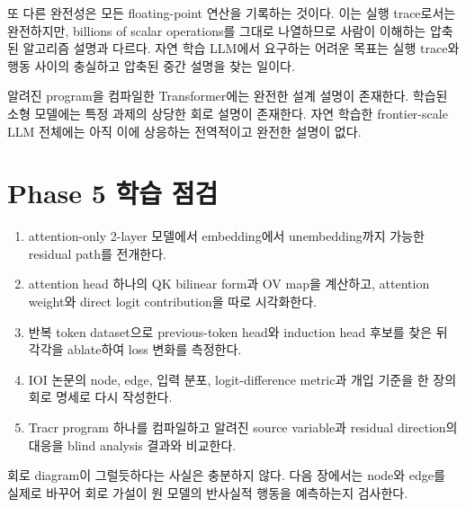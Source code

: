 또 다른 완전성은 모든 floating-point 연산을 기록하는 것이다.
이는 실행 trace로서는 완전하지만, billions of scalar operations를 그대로 나열하므로 사람이 이해하는 압축된 알고리즘 설명과 다르다.
자연 학습 LLM에서 요구하는 어려운 목표는 실행 trace와 행동 사이의 충실하고 압축된 중간 설명을 찾는 일이다.

\begin{factbox}
알려진 program을 컴파일한 Transformer에는 완전한 설계 설명이 존재한다.
학습된 소형 모델에는 특정 과제의 상당한 회로 설명이 존재한다.
자연 학습한 frontier-scale LLM 전체에는 아직 이에 상응하는 전역적이고 완전한 설명이 없다.
\end{factbox}

\section{Phase 5 학습 점검}

\begin{studybox}
\begin{enumerate}
  \item attention-only 2-layer 모델에서 embedding에서 unembedding까지 가능한 residual path를 전개한다.
  \item attention head 하나의 QK bilinear form과 OV map을 계산하고, attention weight와 direct logit contribution을 따로 시각화한다.
  \item 반복 token dataset으로 previous-token head와 induction head 후보를 찾은 뒤 각각을 ablate하여 loss 변화를 측정한다.
  \item IOI 논문의 node, edge, 입력 분포, logit-difference metric과 개입 기준을 한 장의 회로 명세로 다시 작성한다.
  \item Tracr program 하나를 컴파일하고 알려진 source variable과 residual direction의 대응을 blind analysis 결과와 비교한다.
\end{enumerate}
\end{studybox}

\begin{limitbox}
회로 diagram이 그럴듯하다는 사실은 충분하지 않다.
다음 장에서는 node와 edge를 실제로 바꾸어 회로 가설이 원 모델의 반사실적 행동을 예측하는지 검사한다.
\end{limitbox}
